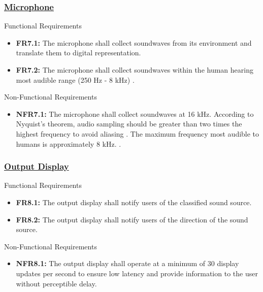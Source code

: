 \documentclass[12pt]{article}
\theoremstyle{definition}
\begin{document}
\subsubsection{\hyperref[comp:microphone]{Microphone}} Functional Requirements
\begin{itemize}
  \item \label{FR7_1}\textbf{FR7.1:} The microphone shall collect soundwaves
  from its environment and translate them to digital representation.

  \item \label{FR7_2}\textbf{FR7.2:} The microphone shall collect soundwaves
  within the human hearing most audible range (250 Hz - 8 kHz)
  \cite{MiracleEar2025}.
\end{itemize}

Non-Functional Requirements
\begin{itemize}
  \item \label{NFR7_1}\textbf{NFR7.1:} The microphone shall collect soundwaves
  at 16 kHz. According to Nyquist's theorem, audio sampling should be greater
  than two times the highest frequency to avoid aliasing \cite{DataForth2025}.
  The maximum frequency most audible to humans is approximately 8 kHz.
  \cite{MiracleEar2025}.
\end{itemize}

\subsubsection{\hyperref[comp:display]{Output Display}} Functional Requirements
\begin{itemize}
  \item \label{FR8_1}\textbf{FR8.1:} The output display shall notify users of
  the classified sound source.

  \item \label{FR8_2}\textbf{FR8.2:} The output display shall notify users of
  the direction of the sound source.
\end{itemize}

Non-Functional Requirements
\begin{itemize}
  \item \label{NFR8_1}\textbf{NFR8.1:} The output display shall operate at a
  minimum of 30 display updates per second to ensure low latency and provide
  information to the user without perceptible delay.
\end{itemize}

\end{document}
